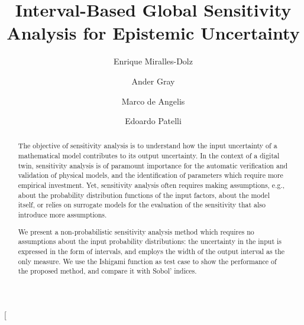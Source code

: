 \documentclass[twocolumn]{rps-esrel2022}
\begin{document}

\twocolumn[

\title{Interval-Based Global Sensitivity Analysis for Epistemic Uncertainty}

\author{Enrique Miralles-Dolz}

\address{Institute for Risk and Uncertainty, University of Liverpool, United Kingdom. }
\address{Culham Centre for Fusion Energy, United Kingdom Atomic Energy Authority, United Kingdom}

\author{Ander Gray}

\address{Institute for Risk and Uncertainty, University of Liverpool, United Kingdom. }
\address{Culham Centre for Fusion Energy, United Kingdom Atomic Energy Authority, United Kingdom}

\author{Marco de Angelis}

\address{Institute for Risk and Uncertainty, University of Liverpool, United Kingdom. }

\author{Edoardo Patelli}

\address{Centre for Intelligent Infrastructure, University of Strathclyde, United Kingdom. }

\begin{abstract}
     The objective of sensitivity analysis is to understand how the input uncertainty of a mathematical model contributes to its output uncertainty.
	In the context of a digital twin, sensitivity analysis is of paramount importance for the automatic verification and validation of physical models, and the identification of parameters which require more empirical investment. Yet, sensitivity analysis often requires making
	assumptions, e.g., about the probability distribution functions of the input factors, about the model itself, or relies on surrogate models for the evaluation of the sensitivity that also introduce more assumptions. %

	We present a non-probabilistic sensitivity analysis method which requires no assumptions about the input probability distributions: the uncertainty in the input is expressed in the form of intervals, and employs the width of the output interval as the only measure. %
	We use the Ishigami function as test case to show the performance of the proposed method, and compare it with Sobol' indices.
\end{abstract}
\end{document}
